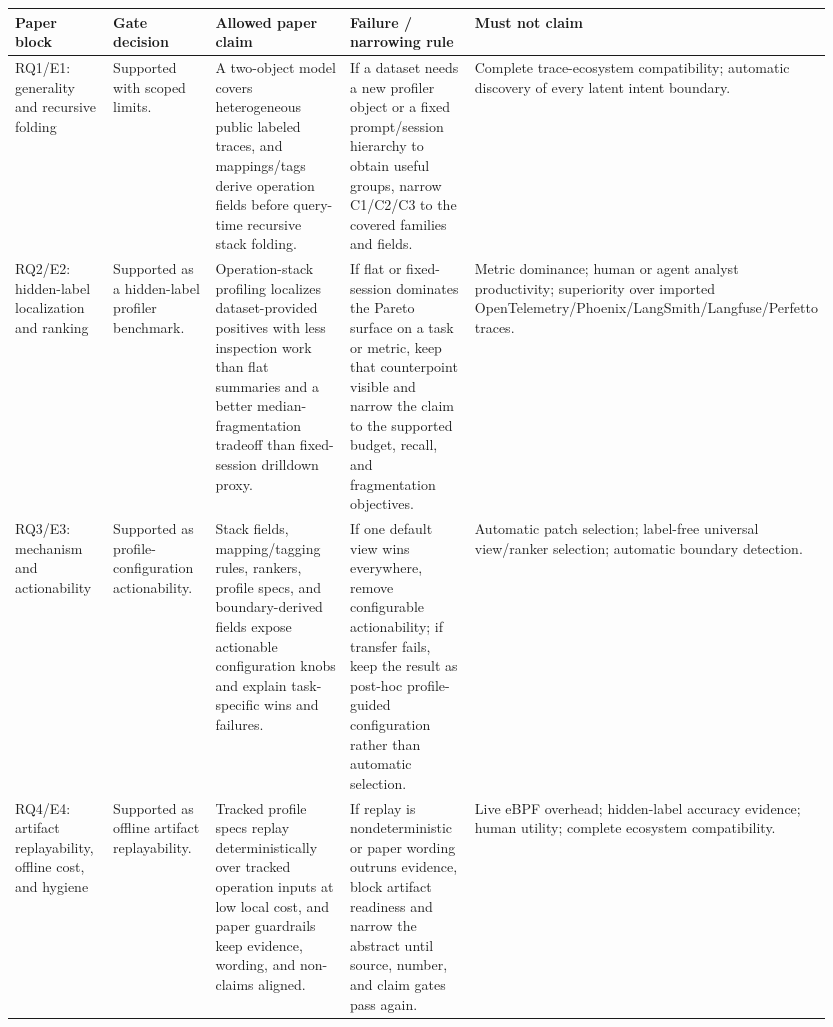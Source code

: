 \begin{tabular}{p{0.15\linewidth}p{0.17\linewidth}p{0.25\linewidth}p{0.20\linewidth}p{0.18\linewidth}}
\toprule
Paper block & Gate decision & Allowed paper claim & Failure / narrowing rule & Must not claim \\
\midrule
RQ1/E1: generality and recursive folding & Supported with scoped limits. & A two-object model covers heterogeneous public labeled traces, and mappings/tags derive operation fields before query-time recursive stack folding. & If a dataset needs a new profiler object or a fixed prompt/session hierarchy to obtain useful groups, narrow C1/C2/C3 to the covered families and fields. & Complete trace-ecosystem compatibility; automatic discovery of every latent intent boundary. \\
RQ2/E2: hidden-label localization and ranking & Supported as a hidden-label profiler benchmark. & Operation-stack profiling localizes dataset-provided positives with less inspection work than flat summaries and a better median-fragmentation tradeoff than fixed-session drilldown proxy. & If flat or fixed-session dominates the Pareto surface on a task or metric, keep that counterpoint visible and narrow the claim to the supported budget, recall, and fragmentation objectives. & Metric dominance; human or agent analyst productivity; superiority over imported OpenTelemetry/Phoenix/LangSmith/Langfuse/Perfetto traces. \\
RQ3/E3: mechanism and actionability & Supported as profile-configuration actionability. & Stack fields, mapping/tagging rules, rankers, profile specs, and boundary-derived fields expose actionable configuration knobs and explain task-specific wins and failures. & If one default view wins everywhere, remove configurable actionability; if transfer fails, keep the result as post-hoc profile-guided configuration rather than automatic selection. & Automatic patch selection; label-free universal view/ranker selection; automatic boundary detection. \\
RQ4/E4: artifact replayability, offline cost, and hygiene & Supported as offline artifact replayability. & Tracked profile specs replay deterministically over tracked operation inputs at low local cost, and paper guardrails keep evidence, wording, and non-claims aligned. & If replay is nondeterministic or paper wording outruns evidence, block artifact readiness and narrow the abstract until source, number, and claim gates pass again. & Live eBPF overhead; hidden-label accuracy evidence; human utility; complete ecosystem compatibility. \\
\bottomrule
\end{tabular}
